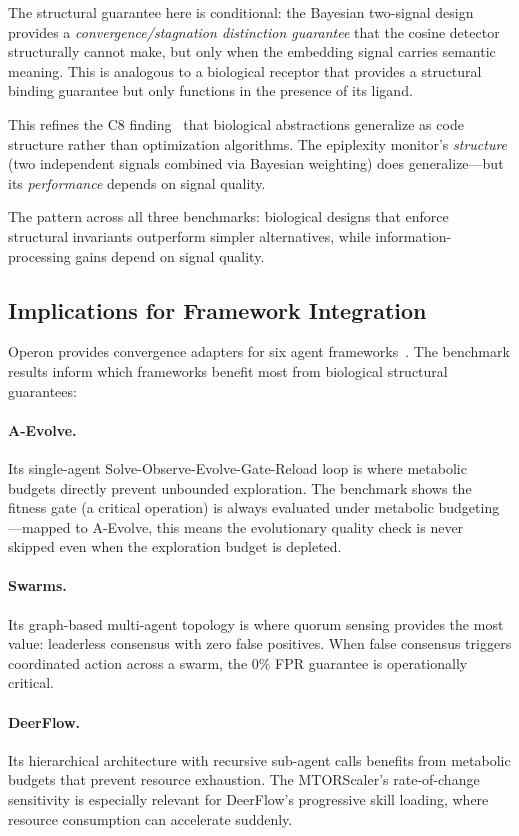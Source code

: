 The structural guarantee here is conditional: the Bayesian two-signal
design provides a \emph{convergence/stagnation distinction guarantee}
that the cosine detector structurally cannot make, but only when the
embedding signal carries semantic meaning.  This is analogous to a
biological receptor that provides a structural binding guarantee but
only functions in the presence of its ligand.

This refines the C8 finding~\cite{banu2026operon} that biological
abstractions generalize as code structure rather than optimization
algorithms.  The epiplexity monitor's \emph{structure} (two independent
signals combined via Bayesian weighting) does generalize---but its
\emph{performance} depends on signal quality.

The pattern across all three benchmarks: biological designs that enforce
structural invariants outperform simpler alternatives, while
information-processing gains depend on signal quality.

\subsection{Implications for Framework Integration}

Operon provides convergence adapters for six agent
frameworks~\cite{banu2026convergence}.  The benchmark results inform
which frameworks benefit most from biological structural guarantees:

\paragraph{A-Evolve.}
Its single-agent Solve-Observe-Evolve-Gate-Reload loop is where
metabolic budgets directly prevent unbounded exploration.  The
benchmark shows the fitness gate (a critical operation) is always
evaluated under metabolic budgeting---mapped to A-Evolve, this means
the evolutionary quality check is never skipped even when the
exploration budget is depleted.

\paragraph{Swarms.}
Its graph-based multi-agent topology is where quorum sensing provides
the most value: leaderless consensus with zero false positives.  When
false consensus triggers coordinated action across a swarm, the 0\%
FPR guarantee is operationally critical.

\paragraph{DeerFlow.}
Its hierarchical architecture with recursive sub-agent calls benefits
from metabolic budgets that prevent resource exhaustion.  The
MTORScaler's rate-of-change sensitivity is especially relevant for
DeerFlow's progressive skill loading, where resource consumption can
accelerate suddenly.

